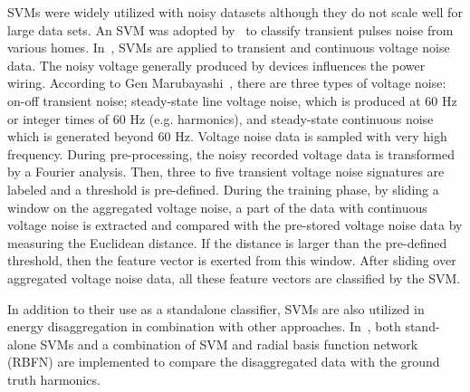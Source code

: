 SVMs were widely utilized with  noisy datasets although they
do not scale well for large data sets. 
An SVM was adopted by~\cite{patel2007flick}
to classify transient pulses noise from various homes.
In~\cite{froehlich2011disaggregated}, 
SVMs are applied to transient and continuous voltage noise data.
The noisy voltage generally produced by devices influences
the power wiring.
According to Gen Marubayashi~\cite{mambayashi1997noise},
there are three types of voltage noise:  
on-off transient noise;
steady-state line voltage noise, which is produced at $60$ Hz or
integer times of $60$ Hz (e.g. harmonics),
and steady-state continuous noise which is generated beyond
$60$ Hz.
Voltage noise data is sampled with very high frequency.
During pre-processing, the noisy recorded voltage data
is transformed by a Fourier analysis. 
Then, three to five transient voltage noise signatures are labeled
and a threshold is pre-defined.
During the training phase,
by sliding a window on the aggregated voltage noise,
a part of the data with continuous voltage noise
is extracted and compared with the pre-stored voltage noise data by measuring the
Euclidean distance.
If the distance is larger than the pre-defined
threshold, then the feature vector is exerted from
this window.
After sliding over aggregated voltage noise data,
all these feature vectors are classified
by the SVM.

In addition to their use
as a standalone classifier, SVMs are also utilized in energy disaggregation 
in combination with other approaches. 
In~\cite{nakano2007non}, 
both stand-alone SVMs and a combination of SVM and radial basis function network (RBFN)
are implemented to compare the disaggregated data with the ground truth harmonics.

